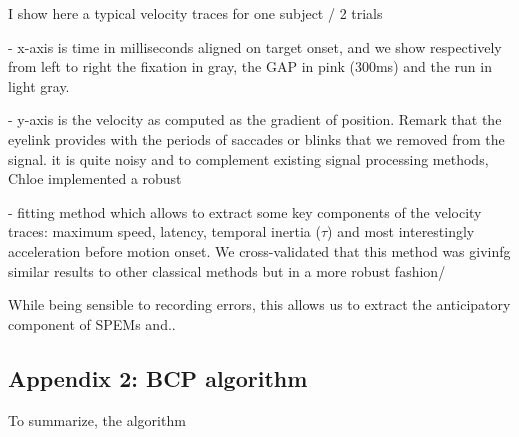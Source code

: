 \documentclass[profile,final,english,draft]{article}%
\begin{document}
I show here a typical velocity traces for one subject / 2 trials

- x-axis is time in milliseconds aligned on target onset,
and we show respectively from left to right the fixation in gray,
the GAP in pink (300ms) and the run in light gray.

- y-axis is the velocity as computed as the gradient of position.
Remark that the eyelink provides with the periods of saccades or
 blinks that we removed from the signal. it is quite noisy and
 to complement existing signal processing methods,
 Chloe implemented a robust

- fitting method which allows to extract some key components of
the velocity traces: maximum speed, latency, temporal inertia ($\tau$)
 and most interestingly acceleration before motion onset.
 We cross-validated that this method was givinfg similar results
  to other classical methods but in a more robust fashion/

While being sensible to recording errors, this allows us to extract the
 anticipatory component of SPEMs and..


\subsection{Appendix 2: BCP algorithm}
\label{app:bcp}

To summarize, the algorithm %
\end{document}
